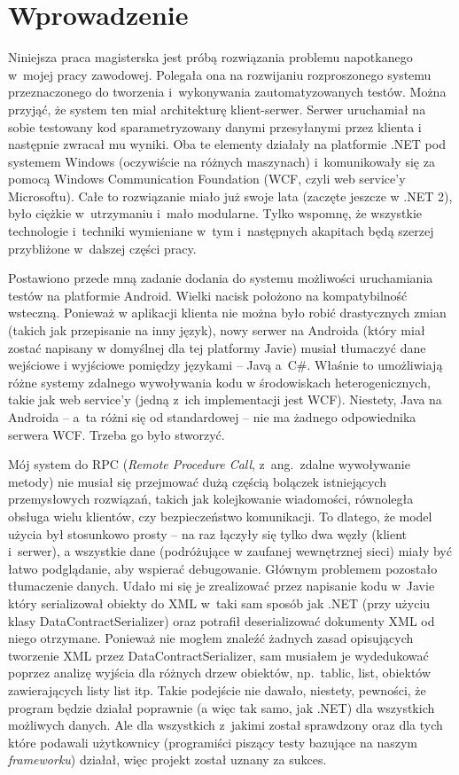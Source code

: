 \chapter{Wprowadzenie}
\label{intro}
Niniejsza praca magisterska jest próbą rozwiązania problemu napotkanego w~mojej pracy zawodowej. Polegała ona na rozwijaniu rozproszonego systemu przeznaczonego do tworzenia i~wykonywania zautomatyzowanych testów.
Można przyjąć, że system ten miał architekturę klient-serwer. Serwer uruchamiał na sobie testowany kod sparametryzowany danymi przesyłanymi przez klienta i następnie zwracał mu wyniki. Oba te elementy działały na platformie .NET pod systemem Windows (oczywiście na różnych maszynach) i~komunikowały się za pomocą Windows Communication Foundation (WCF, czyli web service'y Microsoftu).
Całe to rozwiązanie miało już swoje lata (zaczęte jeszcze w .NET 2), było ciężkie w~utrzymaniu i~mało modularne. Tylko wspomnę, że wszystkie technologie i~techniki wymieniane w~tym i~następnych akapitach będą szerzej przybliżone w~dalszej części pracy.

Postawiono przede mną zadanie dodania do systemu możliwości uruchamiania testów na platformie Android. Wielki nacisk położono na kompatybilność wsteczną. Ponieważ w aplikacji klienta nie można było robić drastycznych zmian (takich jak przepisanie na inny język), nowy serwer na Androida (który miał zostać napisany w domyślnej dla tej platformy Javie) musiał tłumaczyć dane wejściowe i wyjściowe pomiędzy językami -- Javą a~C\#.  Właśnie to umożliwiają różne systemy zdalnego wywoływania kodu w środowiskach heterogenicznych, takie jak web service'y (jedną z~ich implementacji jest WCF). Niestety, Java na Androida -- a~ta różni się od standardowej -- nie ma żadnego odpowiednika serwera WCF\@. Trzeba go było stworzyć.

Mój system do RPC (\emph{Remote Procedure Call}, z~ang.\ zdalne wywoływanie metody) nie musiał się przejmować dużą częścią bolączek istniejących przemysłowych rozwiązań, takich jak kolejkowanie wiadomości, równoległa obsługa wielu klientów, czy bezpieczeństwo komunikacji. To dlatego, że model użycia był stosunkowo prosty -- na raz łączyły się tylko dwa węzły (klient i~serwer), a wszystkie dane (podróżujące w zaufanej wewnętrznej sieci) miały być łatwo podglądanie, aby wspierać debugowanie. Głównym problemem pozostało tłumaczenie danych. Udało mi się je zrealizować przez napisanie kodu w~Javie który serializował obiekty do XML w~taki sam sposób jak .NET (przy użyciu klasy DataContractSerializer) oraz potrafił deserializować dokumenty XML od niego otrzymane. Ponieważ nie mogłem znaleźć żadnych zasad opisujących tworzenie XML przez DataContractSerializer, sam musiałem je wydedukować poprzez analizę wyjścia dla różnych drzew obiektów, np.\ tablic, list, obiektów zawierających listy list itp. Takie podejście nie dawało, niestety, pewności, że program będzie działał poprawnie (a więc tak samo, jak .NET) dla wszystkich możliwych danych. Ale dla wszystkich z~jakimi został sprawdzony oraz dla tych które podawali użytkownicy (programiści piszący testy bazujące na naszym \emph{frameworku}) działał, więc projekt został uznany za sukces.

